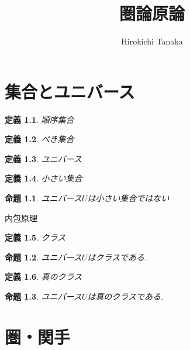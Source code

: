 \documentclass{jsbook}
\title{圏論原論}
\author{Hirokichi Tanaka}
\theoremstyle{plain}
\newtheorem{Def}{定義}[chapter]
\newtheorem{Prop}{命題}[chapter]
\begin{document}
\maketitle

\tableofcontents
\newpage
\chapter{集合とユニバース}
\begin{Def}
順序集合
\end{Def}
\begin{Def}
べき集合
\end{Def}
\begin{Def}
ユニバース
\end{Def}
\begin{Def}
小さい集合
\end{Def}
\begin{Prop}
ユニバース$U$は小さい集合ではない
\end{Prop}
内包原理

\begin{Def}
クラス
\end{Def}
\begin{Prop}
ユニバース$U$はクラスである.
\end{Prop}
\begin{Def}
真のクラス
\end{Def}
\begin{Prop}
ユニバース$U$は真のクラスである.
\end{Prop}
\chapter{圏・関手}
\end{document}
